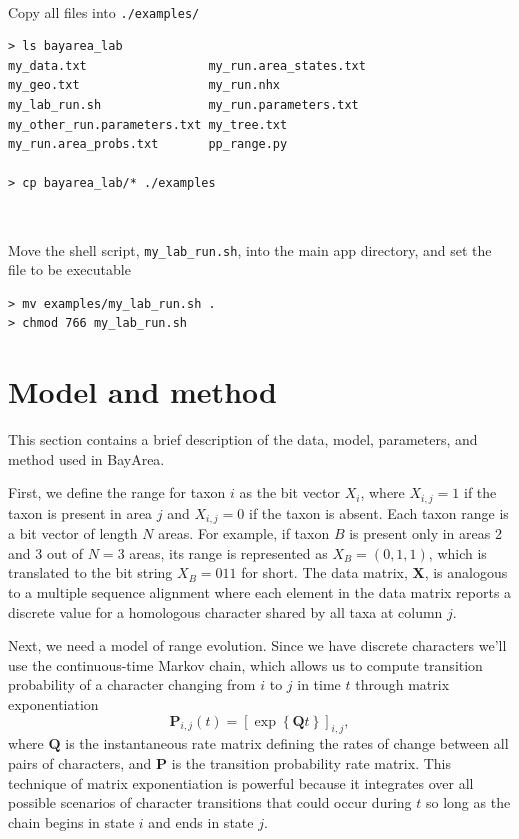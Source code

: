 \documentclass[11pt]{article}
\newcommand{\impmark}{\strut\vadjust{\domark}}
\newcommand{\domark}{%
  \vbox to 0pt{
    \kern-\dp\strutbox
    \smash{\llap{$\rightarrow$\kern1em}}
    \vss
  }%
}
\begin{document}
\noindent \\ \impmark Copy all files into \texttt{./examples/}

\begin{framed}
\begin{lstlisting}
> ls bayarea_lab
my_data.txt                 my_run.area_states.txt
my_geo.txt                  my_run.nhx
my_lab_run.sh               my_run.parameters.txt
my_other_run.parameters.txt my_tree.txt
my_run.area_probs.txt       pp_range.py

> cp bayarea_lab/* ./examples
\end{lstlisting}
\end{framed}

\noindent \\ \impmark Move the shell script, \texttt{my\_lab\_run.sh}, into the main app directory, and set the file to be executable

\begin{framed}
\begin{lstlisting}
> mv examples/my_lab_run.sh .
> chmod 766 my_lab_run.sh
\end{lstlisting}
\end{framed}

\section{Model and method}


This section contains a brief description of the data, model, parameters, and method used in BayArea.

First, we define the range for taxon $i$ as the bit vector $X_i$, where $X_{i,j} = 1$ if the taxon is present in area $j$ and $X_{i,j} = 0$ if the taxon is absent.
Each taxon range is a bit vector of length $N$ areas.
For example, if taxon $B$ is present only in areas 2 and 3 out of $N=3$ areas, its range is represented as $X_B = (0,1,1)$, which is translated to the bit string $X_B=011$ for short.
The data matrix, $\textbf{X}$, is analogous to a multiple sequence alignment where each element in the data matrix reports a discrete value for a homologous character shared by all taxa at column $j$.

Next, we need a model of range evolution.
Since we have discrete characters we'll use the continuous-time Markov chain, which allows us to compute transition probability of a character changing from $i$ to $j$ in time $t$ through matrix exponentiation
\[
\mathbf{P}_{i,j}(t) = \left[ \exp \left\lbrace \mathbf{Q}t \right\rbrace \right]_{i,j},
\]
where $\textbf{Q}$ is the instantaneous rate matrix defining the rates of change between all pairs of characters, and $\textbf{P}$ is the transition probability rate matrix.
This technique of matrix exponentiation is powerful because it integrates over all possible scenarios of character transitions that could occur during $t$ so long as the chain begins in state $i$ and ends in state $j$.
\end{document}
